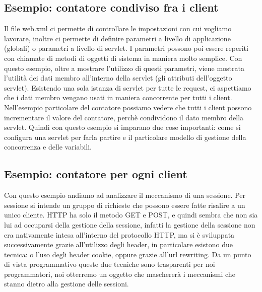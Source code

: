 \subsection{Esempio: contatore condiviso fra i client}
Il file web.xml ci permette di controllare le impostazioni con cui vogliamo lavorare, inoltre ci permette di definire parametri a livello di applicazione (globali) o parametri a livello di servlet.\newline
I parametri possono poi essere reperiti con chiamate di metodi di oggetti di sistema in maniera molto semplice.\newline
Con questo esempio, oltre a mostrare l'utilizzo di questi parametri, viene mostrata l'utilità dei dati membro all'interno della servlet (gli attributi dell'oggetto servlet). Esistendo una sola istanza di servlet per tutte le request, ci aspettiamo che i dati membro vengano usati in maniera concorrente per tutti i client.\newline
Nell'esempio particolare del contatore possiamo vedere che tutti i client possono incrementare il valore del contatore, perchè condividono il dato membro della servlet.\newline
Quindi con questo esempio si imparano due cose importanti: come si configura una servlet per farla partire e il particolare modello di gestione della concorrenza e delle variabili.
\subsection{Esempio: contatore per ogni client}
Con questo esempio andiamo ad analizzare il meccanismo di una sessione. Per sessione si intende un gruppo di richieste che possono essere fatte risalire a un unico cliente. HTTP ha solo il metodo GET e POST, e quindi sembra che non sia lui ad occuparsi della gestione della sessione, infatti la gestione della sessione non era nativamente intesa all'interno del protocollo HTTP, ma si è sviluppata successivamente grazie all'utilizzo degli header, in particolare esistono due tecnica: o l'uso degli header cookie, oppure grazie all'url rewriting.\newline
Da un punto di vista programmativo queste due tecniche sono trasparenti per noi programmatori, noi otterremo un oggetto che maschererà i meccanismi che stanno dietro alla gestione delle sessioni.
